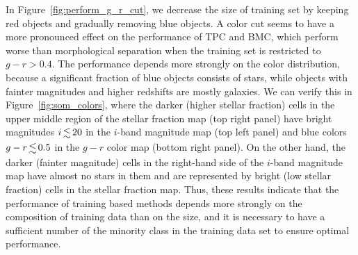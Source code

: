 \documentclass[useAMS,usenatbib]{mn2e}
\begin{document}
In Figure~\ref{fig:perform_g_r_cut},
we decrease the size of training set
by keeping red objects and gradually removing blue objects.
A color cut seems to have a more pronounced effect
on the performance of TPC and BMC,
which perform worse than morphological separation
when the training set is restricted to $g - r > 0.4$.
The performance depends more strongly on the color distribution, because 
a significant fraction of blue objects consists of stars,
while objects with fainter magnitudes and higher redshifts
are mostly galaxies.
We can verify this in Figure~\ref{fig:som_colors},
where the darker (higher stellar fraction) cells in the upper middle region
of the stellar fraction map (top right panel)
have bright magnitudes $i \la 20$
in the $i$-band magnitude map (top left panel)
and blue colors $g-r \la 0.5$ in the $g-r$ color map (bottom right panel).
On the other hand, the darker (fainter magnitude) cells
in the right-hand side of the $i$-band magnitude map
have almost no stars in them and
are represented by bright (low stellar fraction)
cells in the stellar fraction map.
Thus, these results indicate that the performance of training based
methods depends more strongly on the composition of training data
than on the size, and it is necessary to have
a sufficient number of the minority class
in the training data set to ensure optimal performance.
\end{document}

